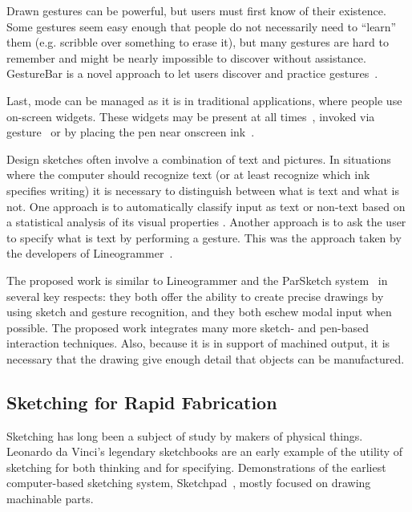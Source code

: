 \documentclass[11pt]{article}
\begin{document}
Drawn gestures can be powerful, but users must first know of their
existence. Some gestures seem easy enough that people do not
necessarily need to ``learn'' them (e.g. scribble over something to
erase it), but many gestures are hard to remember and might be nearly
impossible to discover without assistance. GestureBar is a novel
approach to let users discover and practice
gestures~\cite{bragdon-gesturebar}.

Last, mode can be managed as it is in traditional applications, where
people use on-screen widgets. These widgets may be present at all
times~\cite{forbus-nusketch-battlespace}, invoked via
gesture~\cite{grossman-hover-widgets,kurtenbach-marking-menus} or by
placing the pen near onscreen
ink~\cite{marinkas-shadowbutton,grossman-handle-flag}.

Design sketches often involve a combination of text and pictures. In
situations where the computer should recognize text (or at least
recognize which ink specifies writing) it is necessary to distinguish
between what is text and what is not. One approach is to automatically
classify input as text or non-text based on a statistical analysis of
its visual properties \cite{patel-detect-text}. Another approach is to
ask the user to specify what is text by performing a gesture. This was
the approach taken by the developers of
Lineogrammer~\cite{zeleznik-lineogrammer}.

The proposed work is similar to Lineogrammer and the ParSketch
system~\cite{company-sketching-in-engineering,naya-parsketch} in
several key respects: they both offer the ability to create precise
drawings by using sketch and gesture recognition, and they both eschew
modal input when possible. The proposed work integrates many more
sketch- and pen-based interaction techniques. Also, because it is in
support of machined output, it is necessary that the drawing give
enough detail that objects can be manufactured.

\subsection{Sketching for Rapid Fabrication}

Sketching has long been a subject of study by makers of physical
things. Leonardo da Vinci's legendary sketchbooks are an early example
of the utility of sketching for both thinking and for
specifying. Demonstrations of the earliest computer-based sketching
system, Sketchpad~\cite{sutherland-sketchpad}, mostly focused on
drawing machinable parts.
\end{document}
